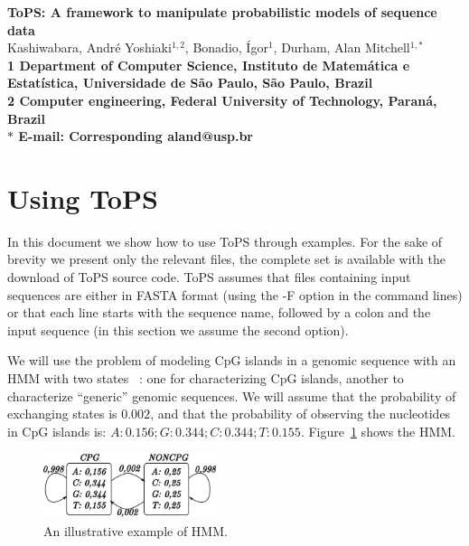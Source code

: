 \documentclass[10pt]{article}
\date{}
\begin{document}
\begin{flushleft}
{\Large
\textbf{ToPS: A framework to manipulate probabilistic models of sequence data}
}
\\
Kashiwabara, Andr\'e Yoshiaki$^{1,2}$, 
Bonadio, \'Igor$^1$, 
Durham, Alan Mitchell$^{1,\ast}$
\\
\bf{1} Department of Computer Science, Instituto de Matem\'atica e Estat\'istica, Universidade de S\~ao Paulo, S\~ao Paulo, Brazil 
\\
\bf{2} Computer engineering, Federal University of Technology, Paran\'a, Brazil
\\
$\ast$ E-mail: Corresponding aland@usp.br
\end{flushleft}

\section*{Using ToPS}

In this document we show how to use ToPS through examples. For the sake of brevity we  present  only the relevant files, the complete set is available with the download of ToPS source code. ToPS assumes that files containing input sequences are either in FASTA format (using the -F option in the command lines) or that each line starts with the sequence name, followed by a colon and the input sequence (in this section we assume the second option).

We will use the problem of modeling CpG  islands in a genomic sequence  with an HMM  with two states ~\cite{Durbin1998}: one for characterizing  CpG islands, another to characterize ``generic'' genomic  sequences.   We will  assume that the probability of exchanging   states is $0.002$, and that the probability of observing the nucleotides in CpG islands is:   $A: 0.156; G: 0.344; C: 0.344; T: 0.155$. Figure~\ref{fig:hmm} shows the HMM.

\begin{figure}[htpb]
  \centering
  \includegraphics[width=0.45\textwidth]{cpg_hmm}
  \caption{An illustrative example of HMM.}
  \label{fig:hmm}
\end{figure}
\end{document}
